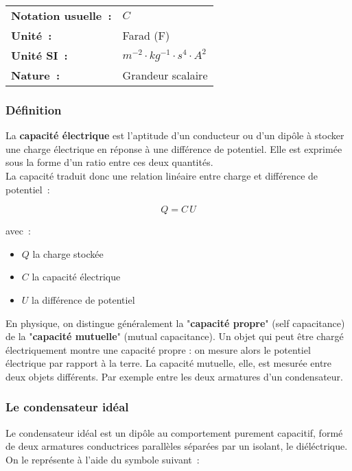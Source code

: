 \vspace{0.5cm}
\begin{tabular}{ll}
\textbf{Notation usuelle~:} & $C$ \\
\textbf{Unité~:} & Farad (F) \\
	\textbf{Unité SI~:} & $m^{-2} \cdot kg^{-1} \cdot {s}^{4} \cdot A^{2}$ \\
\textbf{Nature~:} & Grandeur scalaire \\
\end{tabular} 

\subsubsection*{Définition}


La \textbf{capacité électrique} est l'aptitude d'un conducteur ou d'un dipôle à stocker une charge électrique en réponse à une différence de potentiel. Elle est exprimée sous la forme d'un ratio entre ces deux quantités. \\

La capacité traduit donc une relation linéaire entre charge et différence de potentiel~:

\begin{equation}
	Q = C\,U
\end{equation}

avec~:\\
\begin{itemize}
	\item $Q$ la charge stockée
	\item $C$ la capacité électrique
	\item $U$ la différence de potentiel\\
\end{itemize}

En physique, on distingue généralement la "\textbf{capacité propre}" (self capacitance) de la "\textbf{capacité mutuelle}" (mutual capacitance). Un objet qui peut être chargé électriquement montre une capacité propre : on mesure alors le potentiel électrique par rapport à la terre. La capacité mutuelle, elle, est mesurée entre deux objets différents. Par exemple entre les deux armatures d'un condensateur. \\

\subsubsection{Le condensateur idéal}

Le condensateur idéal est un dipôle au comportement purement capacitif, formé de deux armatures conductrices parallèles séparées par un isolant, le diéléctrique. On le représente à l'aide du symbole suivant~:

